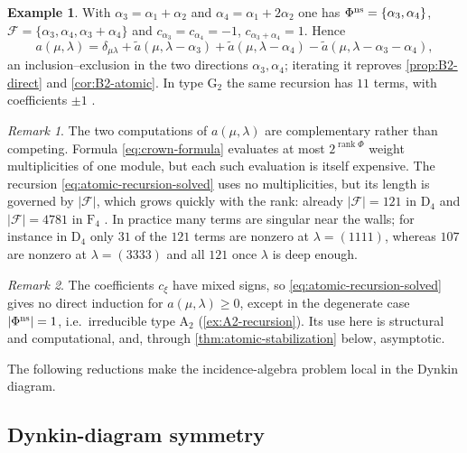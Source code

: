 \documentclass[11pt]{article}
\theoremstyle{definition}
\newtheorem{example}[example]{Example}
\theoremstyle{remark}
\newtheorem{remark}[remark]{Remark}
\newcommand{\Raiz}{\Phi}
\newcommand{\typeA}{\ensuremath{\mathrm{A}}}
\newcommand{\typeD}{\ensuremath{\mathrm{D}}}
\newcommand{\typeF}{\ensuremath{\mathrm{F}}}
\newcommand{\typeG}{\ensuremath{\mathrm{G}}}
\begin{document}
\begin{example}\label{ex:B2-recursion}
With $\alpha_3=\alpha_1+\alpha_2$ and $\alpha_4=\alpha_1+2\alpha_2$ one has
$\Raiz^{\rm ns}=\{\alpha_3,\alpha_4\}$,
$\mathcal F=\{\alpha_3,\alpha_4,\alpha_3+\alpha_4\}$ and
$c_{\alpha_3}=c_{\alpha_4}=-1$, $c_{\alpha_3+\alpha_4}=1$.  Hence
\[
   a(\mu,\lambda)=\delta_{\mu\lambda}
     +\widetilde a(\mu,\lambda-\alpha_3)
     +\widetilde a(\mu,\lambda-\alpha_4)
     -\widetilde a(\mu,\lambda-\alpha_3-\alpha_4),
\]
an inclusion--exclusion in the two directions $\alpha_3,\alpha_4$; iterating
it reproves \cref{prop:B2-direct} and \cref{cor:B2-atomic}.  In type
$\typeG_2$ the same recursion has $11$ terms, with coefficients $\pm1$
\cite[Table~2]{Schutzer}.
\end{example}

\begin{remark}\label{rem:recursion-cost}
The two computations of $a(\mu,\lambda)$ are complementary rather than
competing.  Formula \eqref{eq:crown-formula} evaluates at most
$2^{\operatorname{rank}\Raiz}$ weight multiplicities of one module, but each
such evaluation is itself expensive.  The recursion
\eqref{eq:atomic-recursion-solved} uses no multiplicities, but its length is
governed by $|\mathcal F|$, which grows quickly with the rank: already
$|\mathcal F|=121$ in $\typeD_4$ and $|\mathcal F|=4781$ in $\typeF_4$
\cite[Table~1]{Schutzer}.  In practice many terms are singular near the walls;
for instance in $\typeD_4$ only $31$ of the $121$ terms are nonzero at
$\lambda=(1111)$, whereas $107$ are nonzero at $\lambda=(3333)$ and all
$121$ once $\lambda$ is deep enough.
\end{remark}

\begin{remark}
\label{rem:recursion-no-positivity}
The coefficients $c_\xi$ have mixed signs, so
\eqref{eq:atomic-recursion-solved} gives no direct induction for
$a(\mu,\lambda)\ge0$, except in the degenerate case
$|\Raiz^{\rm ns}|=1$, i.e.\ irreducible type $\typeA_2$
(\cref{ex:A2-recursion}).  Its use here is structural and computational, and,
through \cref{thm:atomic-stabilization} below, asymptotic.
\end{remark}



The following reductions make the incidence-algebra problem local in the Dynkin diagram.

\subsection{Dynkin-diagram symmetry}
\end{document}
